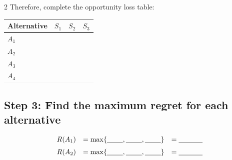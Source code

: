 \begin{multicols}{2}
	Therefore, complete the opportunity loss table:
	\begin{center}
		\renewcommand{\arraystretch}{1.5}
		\small
		\begin{tabular}{lccc}
			\toprule
			Alternative & $S_1$ & $S_2$ & $S_3$ \\
			\midrule
			$A_1$ & \underline{\hspace{1.2cm}} &
			\underline{\hspace{1.2cm}} &
			\underline{\hspace{1.2cm}} \\[3pt]
			$A_2$ & \underline{\hspace{1.2cm}} &
			\underline{\hspace{1.2cm}} &
			\underline{\hspace{1.2cm}} \\[3pt]
			$A_3$ & \underline{\hspace{1.2cm}} &
			\underline{\hspace{1.2cm}} &
			\underline{\hspace{1.2cm}} \\[3pt]
			$A_4$ & \underline{\hspace{1.2cm}} &
			\underline{\hspace{1.2cm}} &
			\underline{\hspace{1.2cm}} \\
			\bottomrule
		\end{tabular}
	\end{center}
	
	\subsection*{Step 3: Find the maximum regret for each alternative}
	
	\[
	\begin{array}{lll}
		R(A_1) &= \max\{\underline{\hspace{0.8cm}},
		\underline{\hspace{0.8cm}},
		\underline{\hspace{0.8cm}}\}
		&= \underline{\hspace{1.2cm}} \\[6pt]
		
		R(A_2) &= \max\{\underline{\hspace{0.8cm}},
		\underline{\hspace{0.8cm}},
		\underline{\hspace{0.8cm}}\}
		&= \underline{\hspace{1.2cm}} \\[6pt]
		

\end{array}\]
\end{multicols}
